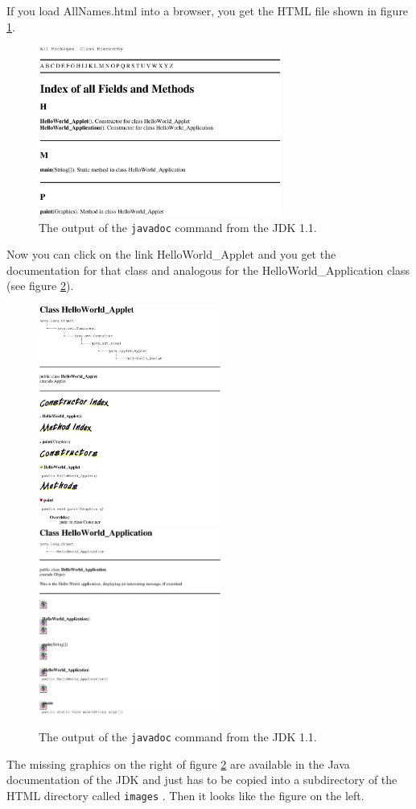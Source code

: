 If you load AllNames.html into a browser, you get the HTML file shown
in figure \ref{fig:javadoc1}.
\begin{figure}[htbp]
  \begin{center}
    \leavevmode
 \includegraphics[width=8cm]{Figures/AllNames.eps} 
    \caption{The output of the \texttt{javadoc} command from the JDK 1.1.}
    \label{fig:javadoc1}
  \end{center}
\end{figure}
Now you can click on the link HelloWorld\_Applet and you get the
documentation for that class and analogous for the HelloWorld\_Application
class (see figure \ref{fig:javadoc2}).
\begin{figure}[htbp]
  \begin{center}
    \leavevmode
  \includegraphics[width=6cm]{Figures/HelloWorld_Applet.eps}
  \includegraphics[width=6cm]{Figures/HelloWorld_Application.eps}
    \caption{The output of the \texttt{javadoc} command from the JDK 1.1.}
    \label{fig:javadoc2}
  \end{center}
\end{figure}
The missing graphics on the right of figure \ref{fig:javadoc2} 
are available in the Java documentation of the
JDK and just has to be copied into a subdirectory  
of the HTML directory called \verb|images| . 
Then it looks like the figure on the left.


